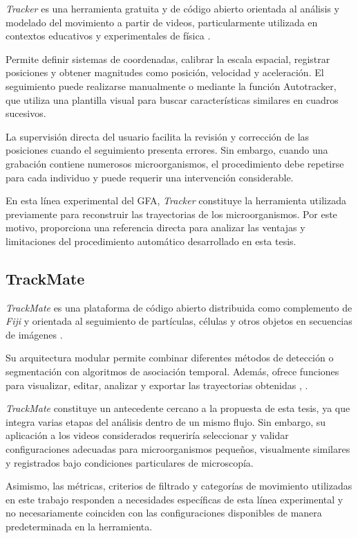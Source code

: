 \textit{Tracker} es una herramienta gratuita y de código abierto orientada al análisis y modelado del movimiento a partir de videos, particularmente utilizada en contextos educativos y experimentales de física \cite{tracker2026}.

Permite definir sistemas de coordenadas, calibrar la escala espacial, registrar posiciones y obtener magnitudes como posición, velocidad y aceleración. El seguimiento puede realizarse manualmente o mediante la función Autotracker, que utiliza una plantilla visual para buscar características similares en cuadros sucesivos.

La supervisión directa del usuario facilita la revisión y corrección de las posiciones cuando el seguimiento presenta errores. Sin embargo, cuando una grabación contiene numerosos microorganismos, el procedimiento debe repetirse para cada individuo y puede requerir una intervención considerable.

En esta línea experimental del GFA, \textit{Tracker} constituye la herramienta utilizada previamente para reconstruir las trayectorias de los microorganismos. Por este motivo, proporciona una referencia directa para analizar las ventajas y limitaciones del procedimiento automático desarrollado en esta tesis.

\subsection{TrackMate}

\textit{TrackMate} es una plataforma de código abierto distribuida como complemento de \textit{Fiji} y orientada al seguimiento de partículas, células y otros objetos en secuencias de imágenes \cite{tinevez2017}.

Su arquitectura modular permite combinar diferentes métodos de detección o segmentación con algoritmos de asociación temporal. Además, ofrece funciones para visualizar, editar, analizar y exportar las trayectorias obtenidas \cite{tinevez2017}, \cite{ershov2022}.

\textit{TrackMate} constituye un antecedente cercano a la propuesta de esta tesis, ya que integra varias etapas del análisis dentro de un mismo flujo. Sin embargo, su aplicación a los videos considerados requeriría seleccionar y validar configuraciones adecuadas para microorganismos pequeños, visualmente similares y registrados bajo condiciones particulares de microscopía.

Asimismo, las métricas, criterios de filtrado y categorías de movimiento utilizadas en este trabajo responden a necesidades específicas de esta línea experimental y no necesariamente coinciden con las configuraciones disponibles de manera predeterminada en la herramienta.

